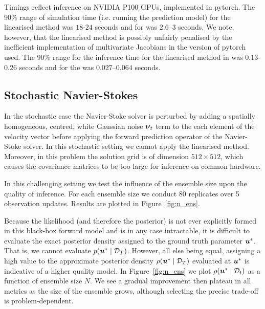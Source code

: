 Timings reflect inference on NVIDIA P100 GPUs, implemented in pytorch.
The 90\% range of simulation time (i.e. running the prediction model) for the linearised method was $18$-$24$ seconds and for \meth{} was $2.6$--$3$ seconds.
We note, however, that the linearised method is possibly unfairly penalised by the inefficient implementation of multivariate Jacobians in the version of pytorch used.
The 90\% range for the inference time for the linearised method in was $0.13$-$0.26$ seconds and for the \meth{} was $0.027$--$0.064$ seconds.

\subsection{Stochastic Navier-Stokes}

In the stochastic case the Navier-Stoke solver is perturbed by adding a spatially homogeneous, centred, white Gaussian noise \(\boldsymbol{\mathsf{\nu}}_t\) term to the each element of the velocity vector before applying the forward prediction operator of the Navier-Stoke solver.
In this stochastic setting we cannot apply the linearised method.
Moreover, in this problem the solution grid is of dimension \(512 \times 512\), which causes the covariance matrices to be too large for inference on common hardware.

In this challenging setting we test the influence of the ensemble size upon the quality of \meth{} inference.
For each ensemble size we conduct 80 replicates over 5 observation updates.
Results are plotted in Figure~\ref{fig:n_ens}.

Because the likelihood (and therefore the posterior) is not ever explicitly formed in this black-box forward model and is in any case intractable, it is difficult to evaluate the exact posterior density assigned to the ground truth parameter $\boldsymbol{u}^\ast$.
That is, we cannot evaluate $p(\boldsymbol{u}^\ast \mid \mathcal{D}_T)$.
However, all else being equal, assigning a high value to the approximate posterior density $\rho(\boldsymbol{u}^\ast \mid \mathcal{D}_T)$ evaluated at $\boldsymbol{u}^\ast$ is indicative of a higher quality model.
In Figure~\ref{fig:n_ens} we plot $\rho(\boldsymbol{u}^\ast \mid \mathcal{D}_t)$ as a function of ensemble size $N$.
We see a gradual improvement then plateau in all metrics as the size of the ensemble grows, although selecting the precise trade-off is problem-dependent.

